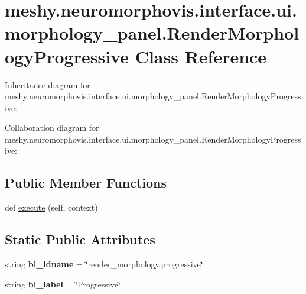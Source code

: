 \hypertarget{classmeshy_1_1neuromorphovis_1_1interface_1_1ui_1_1morphology__panel_1_1RenderMorphologyProgressive}{}\section{meshy.\+neuromorphovis.\+interface.\+ui.\+morphology\+\_\+panel.\+Render\+Morphology\+Progressive Class Reference}
\label{classmeshy_1_1neuromorphovis_1_1interface_1_1ui_1_1morphology__panel_1_1RenderMorphologyProgressive}


Inheritance diagram for meshy.\+neuromorphovis.\+interface.\+ui.\+morphology\+\_\+panel.\+Render\+Morphology\+Progressive\+:


Collaboration diagram for meshy.\+neuromorphovis.\+interface.\+ui.\+morphology\+\_\+panel.\+Render\+Morphology\+Progressive\+:
\subsection*{Public Member Functions}
\begin{DoxyCompactItemize}
\item 
def \hyperlink{classmeshy_1_1neuromorphovis_1_1interface_1_1ui_1_1morphology__panel_1_1RenderMorphologyProgressive_a71583f65929c41f68e084e3815ae1cbc}{execute} (self, context)
\end{DoxyCompactItemize}
\subsection*{Static Public Attributes}
\begin{DoxyCompactItemize}
\item 
string {\bfseries bl\+\_\+idname} = \char`\"{}render\+\_\+morphology.\+progressive\char`\"{}\hypertarget{classmeshy_1_1neuromorphovis_1_1interface_1_1ui_1_1morphology__panel_1_1RenderMorphologyProgressive_a13d7823221b2bb153daa6168950b0523}{}\label{classmeshy_1_1neuromorphovis_1_1interface_1_1ui_1_1morphology__panel_1_1RenderMorphologyProgressive_a13d7823221b2bb153daa6168950b0523}

\item 
string {\bfseries bl\+\_\+label} = \char`\"{}Progressive\char`\"{}\hypertarget{classmeshy_1_1neuromorphovis_1_1interface_1_1ui_1_1morphology__panel_1_1RenderMorphologyProgressive_a7143f58626d339c584b9a32ec233d96b}{}\label{classmeshy_1_1neuromorphovis_1_1interface_1_1ui_1_1morphology__panel_1_1RenderMorphologyProgressive_a7143f58626d339c584b9a32ec233d96b}

\end{DoxyCompactItemize}


